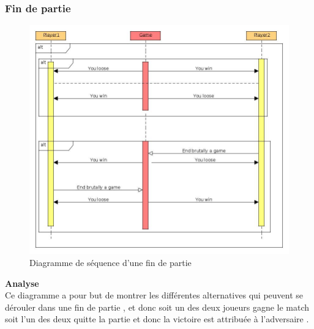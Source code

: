 \subsubsection{Fin de partie}
\begin{figure}[H]
    \includegraphics[width=1\textwidth,height=0.9\textwidth]{Images/EndGameSequenceDiagramm.jpg}
    \caption{\label{Endgame Sequence Diagramm} Diagramme de séquence d'une fin de partie}
\end{figure}
\noindent\textbf{Analyse}\\
{Ce diagramme a pour but de montrer les différentes alternatives qui peuvent se dérouler dans une fin de partie , et donc soit un des deux joueurs gagne le match soit l'un des deux quitte la partie et donc la victoire est attribuée à l'adversaire .
}